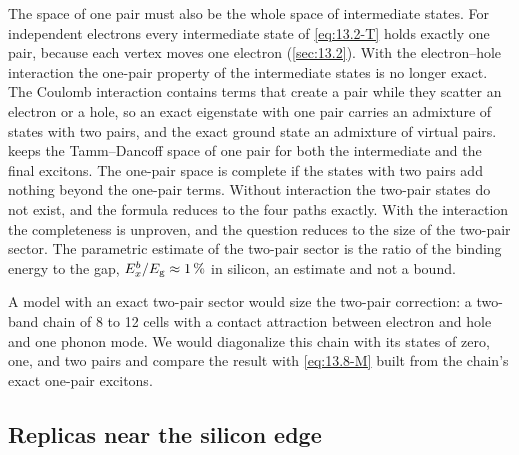 The space of one pair must also be the whole space of intermediate states. For independent electrons every intermediate state of \cref{eq:13.2-T} holds exactly one pair, because each vertex moves one electron (\cref{sec:13.2}). With the electron--hole interaction the one-pair property of the intermediate states is no longer exact. The Coulomb interaction contains terms that create a pair while they scatter an electron or a hole, so an exact eigenstate with one pair carries an admixture of states with two pairs, and the exact ground state an admixture of virtual pairs.  keeps the Tamm--Dancoff space of one pair for both the intermediate and the final excitons. The one-pair space is complete if the states with two pairs add nothing beyond the one-pair terms. Without interaction the two-pair states do not exist, and the formula reduces to the four paths exactly. With the interaction the completeness is unproven, and the question reduces to the size of the two-pair sector. The parametric estimate of the two-pair sector is the ratio of the binding energy to the gap, $E_x^b/E_{\mathrm{g}} \approx \SI{1}{\percent}$ in silicon, an estimate and not a bound.

A model with an exact two-pair sector would size the two-pair correction: a two-band chain of 8 to 12 cells with a contact attraction between electron and hole and one phonon mode. We would diagonalize this chain with its states of zero, one, and two pairs and compare the result with \cref{eq:13.8-M} built from the chain's exact one-pair excitons.

\subsection{Replicas near the silicon edge}

